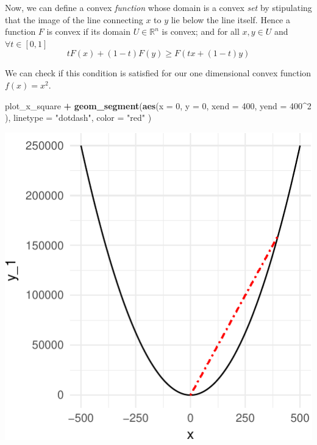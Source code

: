 \documentclass[11pt,]{article}
\newenvironment{Shaded}{\begin{snugshade}}{\end{snugshade}}
\newcommand{\KeywordTok}[1]{\textcolor[rgb]{0.13,0.29,0.53}{\textbf{#1}}}
\newcommand{\DataTypeTok}[1]{\textcolor[rgb]{0.13,0.29,0.53}{#1}}
\newcommand{\DecValTok}[1]{\textcolor[rgb]{0.00,0.00,0.81}{#1}}
\newcommand{\StringTok}[1]{\textcolor[rgb]{0.31,0.60,0.02}{#1}}
\newcommand{\OperatorTok}[1]{\textcolor[rgb]{0.81,0.36,0.00}{\textbf{#1}}}
\newcommand{\NormalTok}[1]{#1}
\begin{document}
Now, we can define a convex \emph{function} whose domain is a convex
\emph{set} by stipulating that the image of the line connecting \(x\) to
\(y\) lie below the line itself. Hence a function \(F\) is convex if its
domain \(U\in \mathbb{R}^n\) is convex; and for all \(x, y\in U\) and
\(\forall t\in[0,1]\) \[
tF(x) + (1-t)F(y) \geq F(tx + (1-t)y)
\]

We can check if this condition is satisfied for our one dimensional
convex function \(f(x)=x^2\).

\begin{Shaded}
\begin{Highlighting}[]
\NormalTok{plot_x_square }\OperatorTok{+}\StringTok{ }
\StringTok{  }\KeywordTok{geom_segment}\NormalTok{(}\KeywordTok{aes}\NormalTok{(}\DataTypeTok{x =} \DecValTok{0}\NormalTok{, }
                   \DataTypeTok{y =} \DecValTok{0}\NormalTok{, }
                   \DataTypeTok{xend =} \DecValTok{400}\NormalTok{, }
                   \DataTypeTok{yend =} \DecValTok{400}\OperatorTok{^}\DecValTok{2}
\NormalTok{                   ), }
               \DataTypeTok{linetype =} \StringTok{"dotdash"}\NormalTok{, }
               \DataTypeTok{color =} \StringTok{"red"}
\NormalTok{               )}
\end{Highlighting}
\end{Shaded}

\includegraphics{Optimization_files/figure-latex/func_convex-1.pdf}
\end{document}
